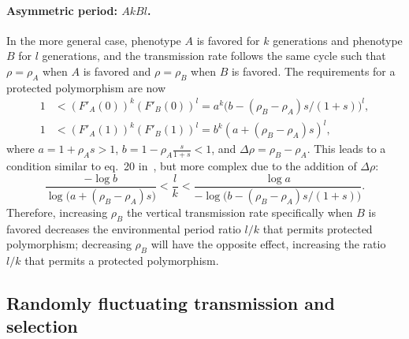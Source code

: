 \documentclass[12pt]{extarticle} %
\begin{document}
\paragraph{Asymmetric period: $AkBl$.}
In the more general case, phenotype $A$ is favored for $k$ generations and phenotype $B$ for $l$ generations, and the transmission rate follows the same cycle such that $\rho=\rho_A$ when $A$ is favored and $\rho=\rho_B$ when $B$ is favored.
The requirements for a protected polymorphism are now
\begin{equation}\begin{aligned}
1 &< (F'_A(0))^k (F'_B(0))^l = a^k \big(b - (\rho_B - \rho_A) s/(1+s)\big)^l,\\
1 &< (F'_A(1))^k (F'_B(1))^l = b^k (a + (\rho_B - \rho_A) s)^l,
\end{aligned}\end{equation}
where $a=1+\rho_A s>1$, $b=1-\rho_A\frac{s}{1+s}<1$, and $\Delta \rho = \rho_B - \rho_A$.
This leads to a condition similar to eq.~20 in~\citet{Ram2018}, but more complex due to the addition of $\Delta \rho$:
\begin{equation} \label{eq:poly_condition_periodic_fluc_k_l}
\frac{-\log{b}}{\log{\big(a+(\rho_B - \rho_A) s\big)}} < 
\frac{l}{k} < 
\frac{\log{a}}{-\log{\big(b-(\rho_B - \rho_A) s/(1+s)\big)}}.
\end{equation}
Therefore, increasing $\rho_B$ the vertical transmission rate specifically when $B$ is favored decreases the environmental period ratio $l/k$ that permits protected polymorphism; decreasing $\rho_B$ will have the opposite effect, increasing the ratio $l/k$ that permits a protected polymorphism.

\subsection*{Randomly fluctuating transmission and selection}
\end{document}
